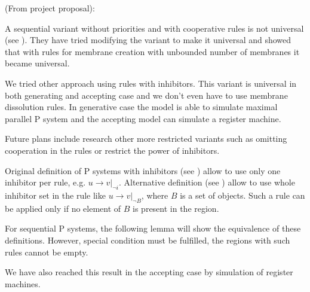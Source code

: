 (From project proposal):

A sequential variant without priorities and with cooperative rules is not universal (see \cite{Ibarra04dang}). They have tried modifying the variant to make it universal and showed that with rules for membrane creation with unbounded number of membranes it became universal.

We tried other approach using rules with inhibitors. This variant is universal in both generating and accepting case and we don't even have to use membrane dissolution rules. In generative case the model is able to simulate maximal parallel P system and the accepting model can simulate a register machine.

Future plans include research other more restricted variants such as omitting cooperation in the rules or restrict the power of inhibitors.

Original definition of P systems with inhibitors (see \cite{Ionescu:jucs_10_5:on_p_systems_with}) allow to use only one inhibitor per rule, e.g. $u\rightarrow v|_{\neg i}$. Alternative definition (see \cite{Agrigoroaiei:2010:Dissolution}) allow to use whole inhibitor set in the rule like $u\rightarrow v|_{\neg B}$, where $B$ is a set of objects. Such a rule can be applied only if no element of $B$ is present in the region.

For sequential P systems, the following lemma will show the equivalence of these definitions. However, special condition must be fulfilled, the regions with such rules cannot be empty.



We have also reached this result in the accepting case by simulation of register machines.

